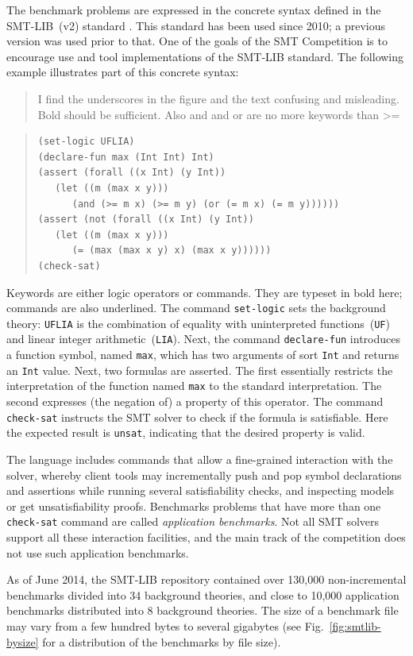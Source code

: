 \documentclass[twoside,11pt]{article}
\newcommand{\comment}[2]{\begin{quote}\sc #1\marginpar{\textcolor{red}{$\ast^{\mbox{#2}}$}}\end{quote}}
\newcommand{\davidc}[1]{\comment{#1}{DC}}
\begin{document}
The benchmark problems are expressed in the concrete syntax defined in the SMT-LIB~(v2) standard \cite{BarST-RR-10}. This standard has been used since 2010; a previous version was used prior to that. One of the goals of the SMT Competition is to encourage use and tool implementations of the SMT-LIB standard. The following example illustrates part of this concrete syntax:
\davidc{I find the underscores in the figure and the text confusing and misleading. Bold should be sufficient. Also and and or are no more keywords than >=}
\begin{quote}
\lstset{frameround=fttt}
\begin{lstlisting}[frame=trBL]
(set-logic UFLIA)
(declare-fun max (Int Int) Int)
(assert (forall ((x Int) (y Int))
   (let ((m (max x y)))
      (and (>= m x) (>= m y) (or (= m x) (= m y))))))
(assert (not (forall ((x Int) (y Int))
   (let ((m (max x y)))
      (= (max (max x y) x) (max x y))))))
(check-sat)
\end{lstlisting}
\end{quote}
Keywords are either logic operators or commands. They are typeset in bold here;
commands are also underlined.  The command \lstinline{set-logic}
sets the background theory: \lstinline{UFLIA} is the combination of
equality with uninterpreted functions~(\lstinline{UF}) and linear
integer arithmetic~(\lstinline{LIA}). Next, the command
\lstinline{declare-fun} introduces a function symbol, named
\lstinline{max}, which has two arguments of sort \lstinline{Int} and
returns an \lstinline{Int} value. Next, two formulas are asserted. The
first essentially restricts the interpretation of the function named
\lstinline{max} to the standard interpretation. The second expresses
(the negation of) a property of this operator. The command
\lstinline{check-sat} instructs the SMT solver to check if the formula
is satisfiable. Here the expected result is \lstinline{unsat},
indicating that the desired property is valid.

The language includes commands that allow a fine-grained interaction
with the solver, whereby client tools may incrementally push and pop
symbol declarations and assertions while running several
satisfiability checks, and inspecting models or get unsatisfiability
proofs. Benchmarks problems that have more than one
\lstinline{check-sat} command are called \emph{application
  benchmarks}. Not all SMT solvers support all these interaction
facilities, and the main track of the competition does not use such
application benchmarks.

As of June 2014, the SMT-LIB repository contained over 130,000
non-incremental benchmarks divided into 34 background theories, and
close to 10,000 application benchmarks distributed into 8 background
theories. The size of a benchmark file may vary from a few hundred
bytes to several gigabytes (see Fig.~\ref{fig:smtlib-bysize} for a
distribution of the benchmarks by file size).
\end{document}
